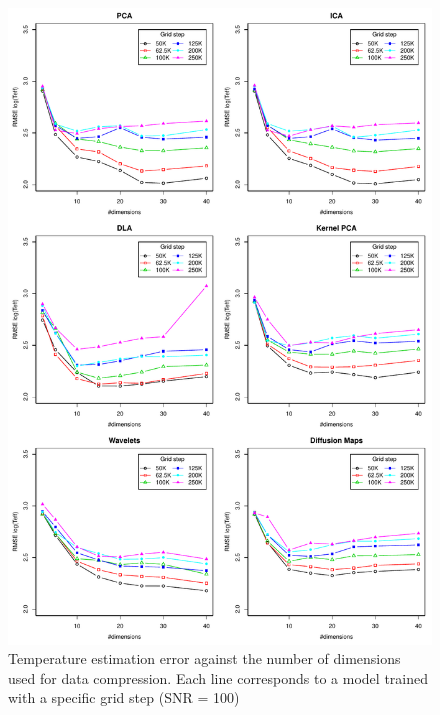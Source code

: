 \documentclass[a4paper,fleqn,usenatbib]{mnras}
\begin{document}
\begin{figure}
\centering\includegraphics[height=0.95\textheight]{bestSVM_Teff_N-RMSE_HR10_snr=100_all.pdf}
\caption{Temperature estimation error against the number of dimensions
  used for data compression. Each line corresponds to a model trained
  with a specific grid step (SNR = 100)}
\label{fig:grid100}
\end{figure}
\end{document}
